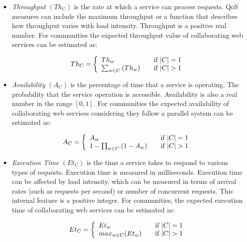 \documentclass[10pt,journal,cspaper,compsoc]{IEEEtran}
\begin{document}
\begin{itemize}

  \item \emph{Throughput $(Th_{C})$} is the rate at which a service can process requests. QoS measures can include the maximum throughput or a function that describes how throughput varies with load intensity. Throughput is a positive real number. For communities the expected throughput value of collaborating web services can be estimated as:
	
	\begin{equation}
		 Th_{C} = \left\{ 
			\begin{array}{l l}
				Th_{w} & \quad \text{if $|C| = 1$}\\
				\sum_{w \in C}{(Th_{w})} & \quad \text{if $|C| > 1$}
			\end{array} \right.
	\end{equation}
	
	\item \emph{Availability $(A_{C})$} is the percentage of time that a service is operating.
	The probability that the service operation is accessible. Availability is also a real number in the range $[0, 1]$. For communities the expected availability of collaborating web services considering they follow a parallel system can be estimated as:
	
	\begin{equation}
		A_{C} = \left\{ 
			\begin{array}{l l}
				A_{w} & \quad \text{if $|C| = 1$}\\
				1-\prod_{w \in C}{(1-A_{w})} & \quad \text{if $|C| > 1$}
			\end{array} \right.
	\end{equation}
	
	\item \emph{Execution Time $(Et_{C})$} is the time a service takes to respond to various types of requests. 
	Execution time is measured in milliseconds. Execution time can be affected by load intensity, which can be measured in terms of arrival rates (such as requests per second) or number of concurrent requests. This internal feature is a positive integer. For communities, the expected execution time of collaborating web services can be estimated as:
	
	\begin{equation}
		Et_{C} = \left\{ 
			\begin{array}{l l}
				Et_{w} & \quad \text{if $|C| = 1$}\\
				max_{w \in C}{(Et_{w})} & \quad \text{if $|C| > 1$}
			\end{array} \right.
	\end{equation}
	
\end{itemize}
\end{document}
